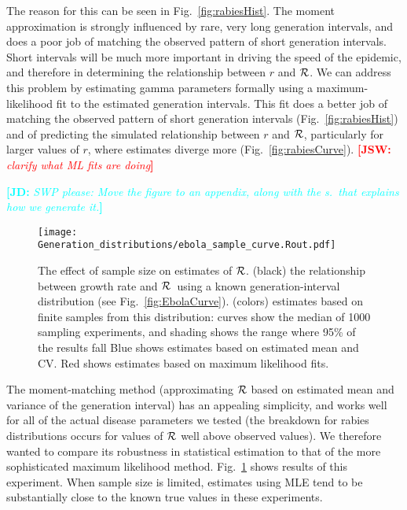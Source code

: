 \documentclass[12pt,]{article}
\newcommand{\RR}{\ensuremath{{\cal R}}}
\newcommand{\fref}[1]{Fig.~\ref{fig:#1}}
\newcommand{\comment}[3]{\textcolor{#1}{\textbf{[#2: }\textit{#3}\textbf{]}}}
\newcommand{\jd}[1]{\comment{cyan}{JD}{#1}}
\newcommand{\jsw}[1]{\comment{red}{JSW}{#1}}
\begin{document}
The reason for this can be seen in \fref{rabiesHist}. The moment approximation is strongly influenced by rare, very long generation intervals, and does a poor job of matching the observed pattern of short generation intervals. Short intervals will be much more important in driving the speed of the epidemic, and therefore in determining the relationship between $r$ and \RR. We can address this problem by estimating gamma parameters formally using a maximum-likelihood fit to the estimated generation intervals. This fit does a better job of matching the observed pattern of short generation intervals (\fref{rabiesHist}) and of predicting the simulated relationship between $r$ and \RR, particularly for larger values of $r$, where estimates diverge more (\fref{rabiesCurve}).
\jsw{clarify what ML fits are doing}

\jd{SWP please: Move the figure to an appendix, along with the s.\ that explains how we generate it.}
\begin{figure}[htbp] \centering
	\texttt{[image: Generation\_distributions/ebola\_sample\_curve.Rout.pdf]}
\caption{
%
The effect of sample size on estimates of \RR.
(black) the relationship between growth rate and \RR~using a known generation-interval distribution (see \fref{EbolaCurve}).
(colors) estimates based on finite samples from this distribution: curves show the median of 1000 sampling experiments, and shading shows the range where 95\% of the results fall
Blue shows estimates based on estimated mean and CV.
Red shows estimates based on maximum likelihood fits.
%
}
	\label{fig:ebolaSample}
\end{figure}

The moment-matching method (approximating $\RR$ based on estimated mean and variance of the generation interval) has an appealing simplicity, and works well for all of the actual disease parameters we tested (the breakdown for rabies distributions occurs for values of $\RR$ well above observed values). We therefore wanted to compare its robustness in statistical estimation to that of the more sophisticated maximum likelihood method. \fref{ebolaSample} shows results of this experiment. When sample size is limited, estimates using MLE tend to be substantially close to the known true values in these experiments.
\end{document}

